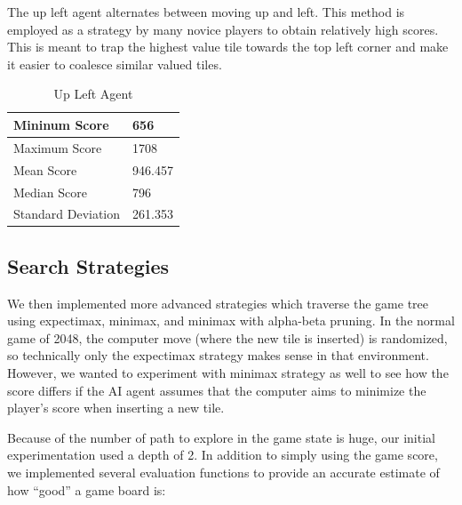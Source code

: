 \documentclass[9pt,twocolumn]{article}
\begin{document}
The up left agent alternates between moving up and left. This method is employed as a strategy by many novice players to obtain relatively high scores. This is meant to trap the highest value tile towards the top left corner and make it easier to coalesce similar valued tiles.

\begin{table}[!htbp]

\centering

\begin{tabular}{|l|l|}
\hline
Mininum Score      & 656 \\ \hline
Maximum Score      & 1708 \\ \hline
Mean Score         & 946.457 \\ \hline
Median Score       & 796 \\ \hline
Standard Deviation & 261.353 \\ \hline
\end{tabular}

\caption{Up Left Agent}

\end{table}

\subsection{Search Strategies}

We then implemented more advanced strategies which traverse the game tree using expectimax, minimax, and minimax with alpha-beta pruning. In the normal game of 2048, the computer move (where the new tile is inserted) is randomized, so technically only the expectimax strategy makes sense in that environment. However, we wanted to experiment with minimax strategy as well to see how the score differs if the AI agent assumes that the computer aims to minimize the player’s score when inserting a new tile.

Because of the number of path to explore in the game state is huge, our initial experimentation used a depth of 2. In addition to simply using the game score, we implemented several evaluation functions to provide an accurate estimate of how “good” a game board is:
\end{document}
